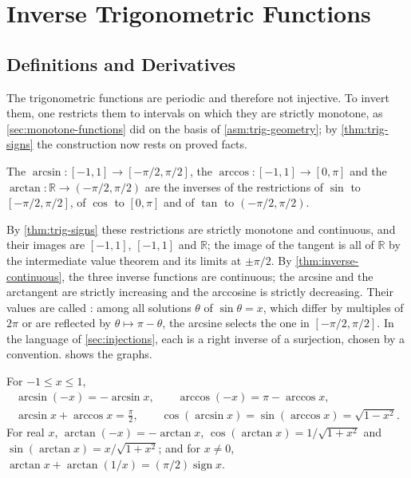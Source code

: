 \section{Inverse Trigonometric Functions}
\label{sec:inverse-trig}

\subsection{Definitions and Derivatives}

The trigonometric functions are periodic and therefore not injective. To invert them, one restricts them to intervals on which they are strictly monotone, as \cref{sec:monotone-functions} did on the basis of \cref{asm:trig-geometry}; by \cref{thm:trig-signs} the construction now rests on proved facts.

\begin{definition}
\label{def:inverse-trig}
The  $\arcsin\colon[-1,1]\to[-\pi/2,\pi/2]$, the  $\arccos\colon[-1,1]\to[0,\pi]$ and the  $\arctan\colon\mathbb R\to(-\pi/2,\pi/2)$ are the inverses of the restrictions of $\sin$ to $[-\pi/2,\pi/2]$, of $\cos$ to $[0,\pi]$ and of $\tan$ to $(-\pi/2,\pi/2)$.
\end{definition}

By \cref{thm:trig-signs} these restrictions are strictly monotone and continuous, and their images are $[-1,1]$, $[-1,1]$ and $\mathbb R$; the image of the tangent is all of $\mathbb R$ by the intermediate value theorem and its limits at $\pm\pi/2$. By \cref{thm:inverse-continuous}, the three inverse functions are continuous; the arcsine and the arctangent are strictly increasing and the arccosine is strictly decreasing. Their values are called : among all solutions $\theta$ of $\sin\theta=x$, which differ by multiples of $2\pi$ or are reflected by $\theta\mapsto\pi-\theta$, the arcsine selects the one in $[-\pi/2,\pi/2]$. In the language of \cref{sec:injections}, each is a right inverse of a surjection, chosen by a convention.  shows the graphs.

\begin{proposition}
\label{prop:inverse-trig-identities}
For $-1\le x\le1$,
\begin{gather*}
\arcsin(-x)=-\arcsin x,\qquad\arccos(-x)=\pi-\arccos x,\\
\arcsin x+\arccos x=\frac\pi2,\qquad\cos(\arcsin x)=\sin(\arccos x)=\sqrt{1-x^2}.
\end{gather*}
For real $x$, $\arctan(-x)=-\arctan x$, $\cos(\arctan x)=1/\sqrt{1+x^2}$ and $\sin(\arctan x)=x/\sqrt{1+x^2}$; and for $x\ne0$, $\arctan x+\arctan(1/x)=(\pi/2)\operatorname{sign}x$.
\end{proposition}

